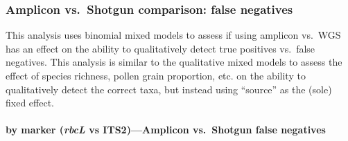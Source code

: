 \documentclass[
]{article}
\begin{document}
\hypertarget{amplicon-vs.-shotgun-comparison-false-negatives}{%
\subsubsection{Amplicon vs.~Shotgun comparison: false
negatives}\label{amplicon-vs.-shotgun-comparison-false-negatives}}

This analysis uses binomial mixed models to assess if using amplicon
vs.~WGS has an effect on the ability to qualitatively detect true
positives vs.~false negatives. This analysis is similar to the
qualitative mixed models to assess the effect of species richness,
pollen grain proportion, etc. on the ability to qualitatively detect the
correct taxa, but instead using ``source'' as the (sole) fixed effect.

\hypertarget{by-marker-rbcl-vs-its2amplicon-vs.-shotgun-false-negatives}{%
\paragraph{\texorpdfstring{by marker (\emph{rbcL} vs ITS2)---Amplicon
vs.~Shotgun false
negatives}{by marker (rbcL vs ITS2)---Amplicon vs.~Shotgun false negatives}}\label{by-marker-rbcl-vs-its2amplicon-vs.-shotgun-false-negatives}}
\end{document}

